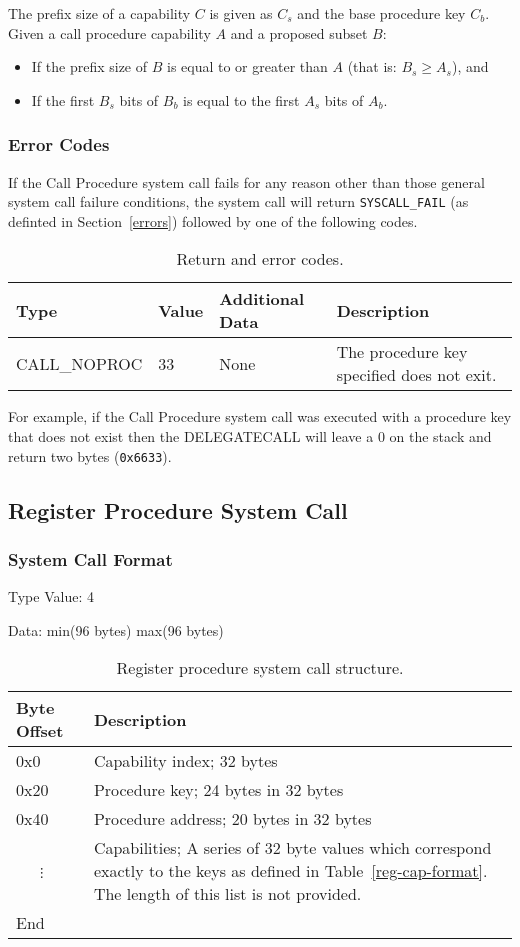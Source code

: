 \documentclass[english,a4paper]{article}
\let\oldparagraph\subsubsection
\renewcommand{\subsubsection}[1]{\oldparagraph{#1}\mbox{}}
\begin{document}
The prefix size of a capability $C$ is given as $C_s$ and the base procedure key
$C_b$. Given a call procedure capability $A$ and a proposed subset $B$:
\begin{itemize}
  \item If the prefix size of $B$ is equal to or greater than $A$ (that is: $B_s
  \geq A_s$), and
  \item If the first $B_s$ bits of $B_b$ is equal to the first $A_s$ bits of
  $A_b$.
\end{itemize}

\subsubsection{Error Codes}
If the Call Procedure system call fails for any reason other than those
general system call failure conditions, the system call will return
\texttt{SYSCALL\_FAIL} (as definted in Section~\ref{errors}) followed by one of
the following codes.

\begin{table}[H]
  \caption{Return and error codes.}
  \centering{}%
  \begin{tabular}{l|l|p{}|p{}}
    \hline
    Type & Value & Additional Data & Description\tabularnewline
    \hline
    \hline
    CALL\_NOPROC  & 33 & None & The procedure key specified does not exit.
      \tabularnewline
    \hline
  \end{tabular}
\end{table}

For example, if the Call
Procedure system call was executed with a procedure key that does not exist then
the DELEGATECALL will leave a 0 on the stack and return two bytes
(\texttt{0x6633}).

\subsection{Register Procedure System Call}

\subsubsection{System Call Format}
Type Value: 4

Data: min(96 bytes) max(96 bytes)

\begin{table}[H]
  \caption{Register procedure system call structure.}
  \centering{}%
  \begin{tabular}{l|p{}}
    \hline
    Byte Offset & Description\tabularnewline
    \hline
    \hline
    0x0 & Capability index; 32 bytes \tabularnewline
    0x20 & Procedure key; 24 bytes in 32 bytes \tabularnewline
    0x40 & Procedure address; 20 bytes in 32 bytes \tabularnewline
    ~~~$\vdots$ & Capabilities; A series of 32 byte values which correspond
    exactly to the keys as defined in Table~\ref{reg-cap-format}. The length of
    this list is not provided. \tabularnewline
    \hline
    End &  \tabularnewline
    \hline
  \end{tabular}
\end{table}
\end{document}
